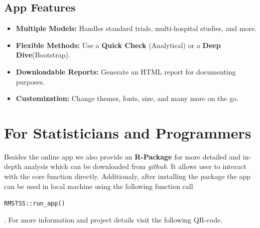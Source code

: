 \documentclass[a0,landscape]{a0poster}
\newcommand{\subsectiondivider}{\par\vspace{4mm}\centerline{\rule{0.9\linewidth}{0.4pt}}\vspace{4mm}}
\begin{document}
\begin{multicols}{3}

\begin{posterbox}
    \subsection*{\Large App Features}
    \begin{itemize}
        \item \large \textbf{Multiple Models:} Handles standard trials, multi-hospital studies, and more.
        \item \large \textbf{Flexible Methods:} Use a \textbf{Quick Check} (Analytical) or a \textbf{Deep Dive}(Bootstrap).
        \item \large \textbf{Downloadable Reports:} Generate an HTML report for documenting purposes.
        \item \large \textbf{Customization:} Change themes, fonts, size, and many more on the go.
    \end{itemize}


    \section*{\Huge For Statisticians and Programmers}
    
    \large Besides the online app we also provide an \textbf{R-Package} for more detailed and in-depth analysis which can be downloaded from \textit{github}. It allows user to interact with the core function directly. Additionaly, after installing the package the app can be used in local machine using the following function call
    \begin{alltt}
          RMSTSS::run_app()
    \end{alltt}
    \large . For more information and project details visit the following QR-code.
    

\end{posterbox}
\end{multicols}
\end{document}
